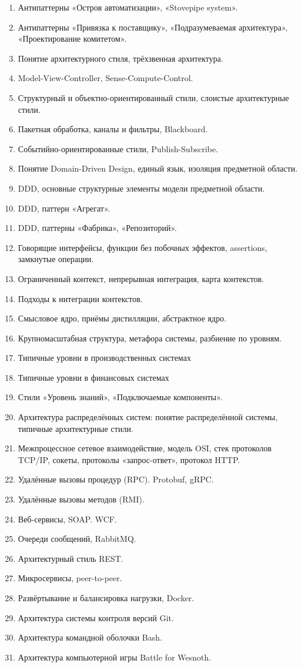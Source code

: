 \documentclass[a5paper]{article}
\begin{document}
\begin{enumerate}
    \item Антипаттерны «Остров автоматизации», «Stovepipe system».
    \item Антипаттерны «Привязка к поставщику», «Подразумеваемая архитектура», «Проектирование комитетом».
    \item Понятие архитектурного стиля, трёхзвенная архитектура.
    \item Model-View-Controller, Sense-Compute-Control.
    \item Структурный и объектно-ориентированный стили, слоистые архитектурные стили.
    \item Пакетная обработка, каналы и фильтры, Blackboard.
    \item Событийно-ориентированные стили, Publish-Subscribe.
    \item Понятие Domain-Driven Design, единый язык, изоляция предметной области.
    \item DDD, основные структурные элементы модели предметной области.
    \item DDD, паттерн «Агрегат».
    \item DDD, паттерны «Фабрика», «Репозиторий».
    \item Говорящие интерфейсы, функции без побочных эффектов, assertions, замкнутые операции.
    \item Ограниченный контекст, непрерывная интеграция, карта контекстов.
    \item Подходы к интеграции контекстов.
    \item Смысловое ядро, приёмы дистилляции, абстрактное ядро.
    \item Крупномасштабная структура, метафора системы, разбиение по уровням. 
    \item Типичные уровни в производственных системах
    \item Типичные уровни в финансовых системах 
    \item Стили «Уровень знаний», «Подключаемые компоненты».
    \item Архитектура распределённых систем: понятие распределённой системы, типичные архитектурные стили.
    \item Межпроцессное сетевое взаимодействие, модель OSI, стек протоколов TCP/IP, сокеты, протоколы «запрос-ответ», протокол HTTP.
    \item Удалённые вызовы процедур (RPC). Protobuf, gRPC.
    \item Удалённые вызовы методов (RMI).
    \item Веб-сервисы, SOAP. WCF.
    \item Очереди сообщений, RabbitMQ.
    \item Архитектурный стиль REST.
    \item Микросервисы, peer-to-peer.
    \item Развёртывание и балансировка нагрузки, Docker.
    \item Архитектура системы контроля версий Git.
    \item Архитектура командной оболочки Bash.
    \item Архитектура компьютерной игры Battle for Wesnoth.
\end{enumerate}
\end{document}
